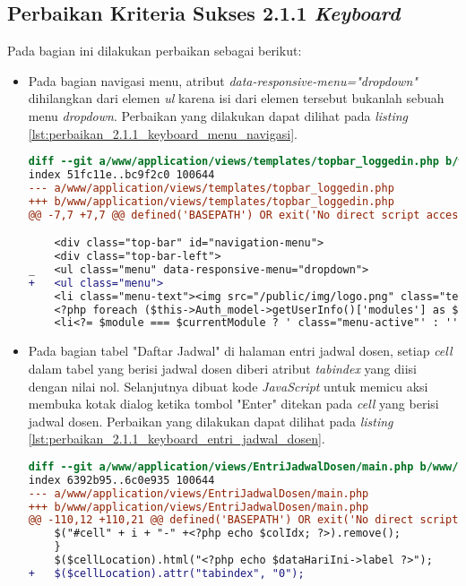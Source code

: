 \subsection{Perbaikan Kriteria Sukses 2.1.1 \textit{Keyboard}}
\label{subsec:perbaikan_kriteria_sukses_2.1.1}
Pada bagian ini dilakukan perbaikan sebagai berikut:

\begin{itemize}
\item Pada bagian navigasi menu, atribut \textit{data-responsive-menu="dropdown"} dihilangkan dari elemen \textit{ul} karena isi dari elemen tersebut bukanlah sebuah menu \textit{dropdown}. Perbaikan yang dilakukan dapat dilihat pada \textit{listing} \ref{lst:perbaikan_2.1.1_keyboard_menu_navigasi}.
\begin{lstlisting}[frame=single, label={lst:perbaikan_2.1.1_keyboard_menu_navigasi}, language=diff, caption=Perbaikan Kriteria Sukses 2.1.1 pada Menu Navigasi]
diff --git a/www/application/views/templates/topbar_loggedin.php b/www/application/views/templates/topbar_loggedin.php
index 51fc11e..bc9f2c0 100644
--- a/www/application/views/templates/topbar_loggedin.php
+++ b/www/application/views/templates/topbar_loggedin.php
@@ -7,7 +7,7 @@ defined('BASEPATH') OR exit('No direct script access allowed');

    <div class="top-bar" id="navigation-menu">
    <div class="top-bar-left">
_   <ul class="menu" data-responsive-menu="dropdown">
+   <ul class="menu">
    <li class="menu-text"><img src="/public/img/logo.png" class="textsized" alt="B"/></li>
    <?php foreach ($this->Auth_model->getUserInfo()['modules'] as $module): ?>
    <li<?= $module === $currentModule ? ' class="menu-active"' : '' ?>><a href="/<?= $module ?>"><?= $this->config->item('module-names')[$module] ?></a></li>
\end{lstlisting}

\item Pada bagian tabel "Daftar Jadwal" di halaman entri jadwal dosen, setiap \textit{cell} dalam tabel yang berisi jadwal dosen diberi atribut \textit{tabindex} yang diisi dengan nilai nol. Selanjutnya dibuat kode \textit{JavaScript} untuk memicu aksi membuka kotak dialog ketika tombol "Enter" ditekan pada \textit{cell} yang berisi jadwal dosen. Perbaikan yang dilakukan dapat dilihat pada \textit{listing} \ref{lst:perbaikan_2.1.1_keyboard_entri_jadwal_dosen}.
\begin{lstlisting}[frame=single, label={lst:perbaikan_2.1.1_keyboard_entri_jadwal_dosen}, language=diff, caption=Perbaikan Kriteria Sukses 2.1.1 pada Halaman Entri Jadwal Dosen]
diff --git a/www/application/views/EntriJadwalDosen/main.php b/www/application/views/EntriJadwalDosen/main.php
index 6392b95..6c0e935 100644
--- a/www/application/views/EntriJadwalDosen/main.php
+++ b/www/application/views/EntriJadwalDosen/main.php
@@ -110,12 +110,21 @@ defined('BASEPATH') OR exit('No direct script access allowed');
    $("#cell" + i + "-" +<?php echo $colIdx; ?>).remove();
    }
    $($cellLocation).html("<?php echo $dataHariIni->label ?>");
+   $($cellLocation).attr("tabindex", "0");


\end{lstlisting}
\end{itemize}
